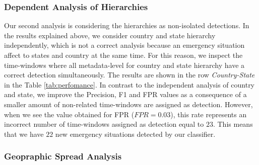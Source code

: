 \documentclass[sigconf]{acmart}
\begin{document}
\subsubsection{Dependent Analysis of Hierarchies}
Our second analysis is considering the hierarchies as non-isolated detections. In the results explained above, we consider country and state hierarchy independently, which is not a correct analysis because an emergency situation affect to states and country at the same time. For this reason, we inspect the time-windows where all metadata-level for country and state hierarchy have a correct detection simultaneously. The results are shown in the row \textit{Country-State} in the Table \ref{tab:perfomance}. In contrast to the independent analysis of country and state, we improve the Precision, F1 and FPR values as a consequence of a smaller amount of non-related time-windows are assigned as detection. However, when we see the value obtained for FPR ($FPR = 0.03$), this rate represents an incorrect number of time-windows assigned as detection equal to $23$. This means that we have $22$ new emergency situations detected by our classifier. 


\subsubsection{Geopraphic Spread Analysis}\label{sssec:geospreadanalysis}
\end{document}
